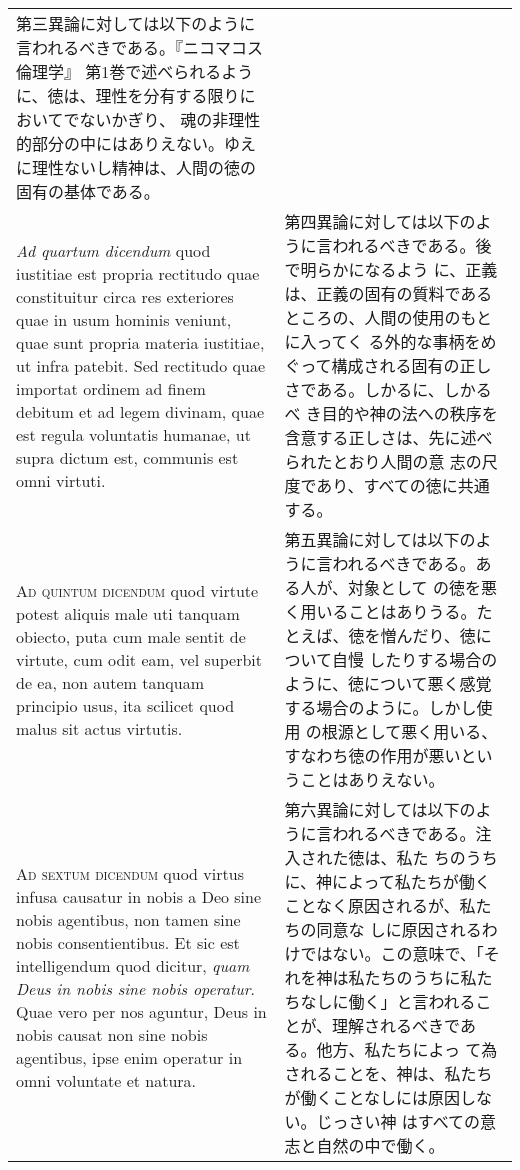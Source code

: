 \documentclass[10pt]{jsarticle}
\begin{document}
\begin{longtable}{p{21em}p{21em}}
第三異論に対しては以下のように言われるべきである。『ニコマコス倫理学』
第1巻で述べられるように、徳は、理性を分有する限りにおいてでないかぎり、
魂の非理性的部分の中にはありえない。ゆえに理性ないし精神は、人間の徳の
固有の基体である。

\\



{\itshape Ad quartum dicendum} quod iustitiae est propria rectitudo
quae constituitur circa res exteriores quae in usum hominis veniunt,
quae sunt propria materia iustitiae, ut infra patebit. Sed rectitudo
quae importat ordinem ad finem debitum et ad legem divinam, quae est
regula voluntatis humanae, ut supra dictum est, communis est omni
virtuti.

&

第四異論に対しては以下のように言われるべきである。後で明らかになるよう
に、正義は、正義の固有の質料であるところの、人間の使用のもとに入ってく
る外的な事柄をめぐって構成される固有の正しさである。しかるに、しかるべ
き目的や神の法への秩序を含意する正しさは、先に述べられたとおり人間の意
志の尺度であり、すべての徳に共通する。

\\



{\scshape Ad quintum dicendum} quod virtute potest aliquis male uti
tanquam obiecto, puta cum male sentit de virtute, cum odit eam, vel
superbit de ea, non autem tanquam principio usus, ita scilicet quod
malus sit actus virtutis.


&

第五異論に対しては以下のように言われるべきである。ある人が、対象として
の徳を悪く用いることはありうる。たとえば、徳を憎んだり、徳について自慢
したりする場合のように、徳について悪く感覚する場合のように。しかし使用
の根源として悪く用いる、すなわち徳の作用が悪いということはありえない。

\\



{\scshape Ad sextum dicendum} quod virtus infusa causatur in nobis a
Deo sine nobis agentibus, non tamen sine nobis consentientibus. Et sic
est intelligendum quod dicitur, {\itshape quam Deus in nobis sine
nobis operatur}. Quae vero per nos aguntur, Deus in nobis causat non
sine nobis agentibus, ipse enim operatur in omni voluntate et natura.


&

第六異論に対しては以下のように言われるべきである。注入された徳は、私た
ちのうちに、神によって私たちが働くことなく原因されるが、私たちの同意な
しに原因されるわけではない。この意味で、「それを神は私たちのうちに私た
ちなしに働く」と言われることが、理解されるべきである。他方、私たちによっ
て為されることを、神は、私たちが働くことなしには原因しない。じっさい神
はすべての意志と自然の中で働く。


\end{longtable}
\end{document}

